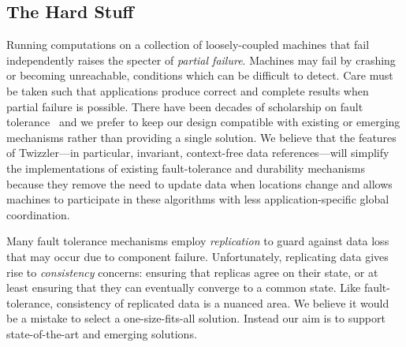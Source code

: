 \subsection{The Hard Stuff}

Running computations on a collection of loosely-coupled machines that fail independently raises the specter of
\emph{partial failure}.  Machines may fail by crashing or becoming unreachable, conditions which
can be difficult to detect. Care must be taken such that applications produce correct and complete
results when partial failure is possible.  There have been decades of scholarship on
fault tolerance~\cite{gray-dbos,3pc,bully,whydo,primary-site, primary-copy, thomas-quorum,paxos,zab}
and we prefer to keep our design compatible with existing or emerging mechanisms rather than providing a single solution.
We believe that the features of Twizzler---in particular, invariant, context-free data references---will simplify the implementations
of existing fault-tolerance and durability mechanisms because they remove the need to update data
when locations change and allows machines to participate in these algorithms with less
application-specific global coordination.

Many fault tolerance mechanisms employ \emph{replication} to guard against data loss that may occur
due to component failure.
Unfortunately, replicating data gives rise to \emph{consistency} concerns: ensuring that replicas agree on their state,
or at least ensuring that they can eventually converge to a common state.  Like fault-tolerance, consistency of replicated data
is a nuanced area.  We believe it would be a mistake to select a one-size-fits-all solution.  Instead our aim is to support
state-of-the-art and emerging solutions.

